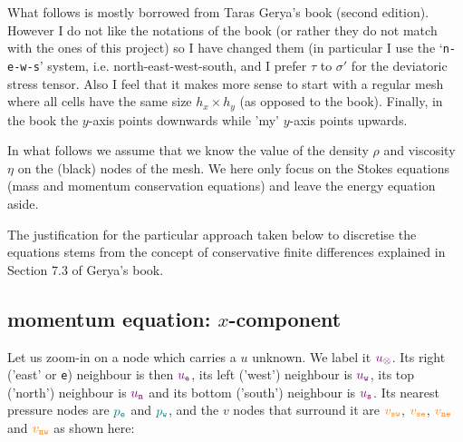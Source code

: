 What follows is mostly borrowed from Taras Gerya's book (second edition). 
However I do not like the notations of the book (or rather they do not match
with the ones of this project) so I have changed them (in particular I use 
the `{\tt n-e-w-s}' system, i.e. north-east-west-south, 
and I prefer $\tau$ to  $\sigma'$ for the deviatoric stress tensor.
Also I feel that it makes more sense to start with a regular mesh 
where all cells have the same size $h_x \times h_y$ (as opposed to the book).
Finally, in the book the $y$-axis points downwards while 'my' $y$-axis 
points upwards.

In what follows we assume that we know the value of the density $\rho$
and viscosity $\eta$ on the (black) nodes of the mesh. We here only focus on the 
Stokes equations (mass and momentum conservation equations) and leave the energy
equation aside.

The justification for the particular approach taken below to 
discretise the equations stems from the concept of conservative 
finite differences explained in Section 7.3 of Gerya's book. 


\subsection{momentum equation: $x$-component}

Let us zoom-in on a node which carries a $u$ unknown. 
We label it ${\color{violet}u_\otimes}$. Its right ('east' or {\tt e})  
neighbour is then ${\color{violet}u_{\tt e}}$,
its left ('west') neighbour is ${\color{violet}u_{\tt w}}$, 
its top ('north') neighbour is ${\color{violet}u_{\tt n}}$ and 
its bottom ('south') neighbour is ${\color{violet}u_{\tt s}}$.
Its nearest pressure nodes are ${\color{teal}p_{\tt e}}$ and 
${\color{teal}p_{\tt w}}$, and the $v$ nodes
that surround it are ${\color{orange}v_{\tt sw}}$, 
${\color{orange}v_{\tt se}}$, ${\color{orange}v_{\tt ne}}$ and 
${\color{orange}v_{\tt nw}}$ as shown here:


